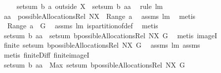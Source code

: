 \begin{isabellebody}
\ \isanewline
\ \ {}{\isacharcolon}\ {\isachardoublequoteopen}setsum\ b\ {\isacharparenleft}a\ outside\ X{\isacharparenright}\ {\isasymle}\ setsum\ b\ {\isacharquery}aa{\isachardoublequoteclose}\ \isamarkupfalse%
\ {\isacharparenleft}rule\ lm{}{}{\isacharparenright}\isanewline
\ \ \isamarkupfalse%
\ {\isachardoublequoteopen}{\isacharquery}aa\ {\isasymin}\ possibleAllocationsRel\ {\isacharparenleft}N{\isacharminus}X{\isacharparenright}\ {\isacharparenleft}{\isasymUnion}\ {\isacharparenleft}Range\ a{\isacharparenright}{\isacharparenright}{\isachardoublequoteclose}\ \isamarkupfalse%
\ assms\ lm{}{}\ \isamarkupfalse%
\ metis\isanewline
\ \ \isamarkupfalse%
\ \isamarkupfalse%
\ {\isachardoublequoteopen}{\isasymUnion}\ {\isacharparenleft}Range\ a{\isacharparenright}\ {\isacharequal}\ G{\isachardoublequoteclose}\ \isamarkupfalse%
\ assms\ lm{}{}\ is{\isacharunderscore}partition{\isacharunderscore}of{\isacharunderscore}def\ \isamarkupfalse%
\ metis\isanewline
\ \ \isamarkupfalse%
\ \isamarkupfalse%
\ {\isachardoublequoteopen}setsum\ b\ {\isacharquery}aa\ {\isasymin}\ {\isacharparenleft}setsum\ b{\isacharparenright}{\isacharbackquote}{\isacharparenleft}possibleAllocationsRel\ {\isacharparenleft}N{\isacharminus}X{\isacharparenright}\ G{\isacharparenright}{\isachardoublequoteclose}\ \isamarkupfalse%
\ {\isacharparenleft}metis\ imageI{\isacharparenright}\isanewline
\ \ \isamarkupfalse%
\ \isamarkupfalse%
\ {\isachardoublequoteopen}finite\ {\isacharparenleft}{\isacharparenleft}setsum\ b{\isacharparenright}{\isacharbackquote}{\isacharparenleft}possibleAllocationsRel\ {\isacharparenleft}N{\isacharminus}X{\isacharparenright}\ G{\isacharparenright}{\isacharparenright}{\isachardoublequoteclose}\ \isamarkupfalse%
\ assms\ lm{}{}\ assms{\isacharparenleft}{}{\isacharcomma}{}{\isacharparenright}\isanewline
\ \ \isamarkupfalse%
\ {\isacharparenleft}metis\ finite{\isacharunderscore}Diff\ finite{\isacharunderscore}imageI{\isacharparenright}\isanewline
\ \ \isamarkupfalse%
\ \isamarkupfalse%
\ {\isachardoublequoteopen}setsum\ b\ {\isacharquery}aa\ {\isasymle}\ Max\ {\isacharparenleft}{\isacharparenleft}setsum\ b{\isacharparenright}{\isacharbackquote}{\isacharparenleft}possibleAllocationsRel\ {\isacharparenleft}N{\isacharminus}X{\isacharparenright}\ G{\isacharparenright}{\isacharparenright}{\isachardoublequoteclose}\ \isamarkupfalse%

\end{isabellebody}
